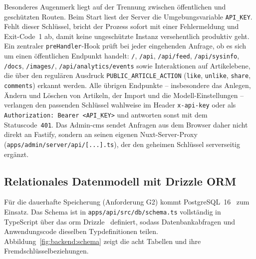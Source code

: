 Besonderes Augenmerk liegt auf der Trennung zwischen öffentlichen und geschützten Routen.
Beim Start liest der Server die Umgebungsvariable \texttt{API\_KEY}.
Fehlt dieser Schlüssel, bricht der Prozess sofort mit einer Fehlermeldung und Exit-Code~1 ab, damit keine ungeschützte Instanz versehentlich produktiv geht.
Ein zentraler \texttt{preHandler}-Hook prüft bei jeder eingehenden Anfrage, ob es sich um einen öffentlichen Endpunkt handelt: \texttt{/}, \texttt{/api}, \texttt{/api/feed}, \texttt{/api/sysinfo}, \texttt{/docs}, \texttt{/images/}, \texttt{/api/analytics/events} sowie Interaktionen auf Artikelebene, die über den regulären Ausdruck \texttt{PUBLIC\_ARTICLE\_ACTION} (\texttt{like}, \texttt{unlike}, \texttt{share}, \texttt{comments}) erkannt werden.
Alle übrigen Endpunkte – insbesondere das Anlegen, Ändern und Löschen von Artikeln, der Import und die Modell-Einstellungen – verlangen den passenden Schlüssel wahlweise im Header \texttt{x-api-key} oder als \texttt{Authorization: Bearer <API\_KEY>} und antworten sonst mit dem Statuscode~\texttt{401}.
Das Admin-\gls{cms} sendet Anfragen aus dem Browser daher nicht direkt an Fastify, sondern an seinen eigenen Nuxt-Server-Proxy (\texttt{apps/admin/server/api/[...].ts}), der den geheimen Schlüssel serverseitig ergänzt.

\subsection{Relationales Datenmodell mit Drizzle ORM}

Für die dauerhafte Speicherung (Anforderung G2) kommt PostgreSQL~16~\cite{postgresql} zum Einsatz.
Das Schema ist in \texttt{apps/api/src/db/schema.ts} vollständig in TypeScript über das \gls{orm} Drizzle~\cite{drizzleorm} definiert, sodass Datenbankabfragen und Anwendungscode dieselben Typdefinitionen teilen.
Abbildung~\ref{fig:backend:schema} zeigt die acht Tabellen und ihre Fremdschlüsselbeziehungen.

